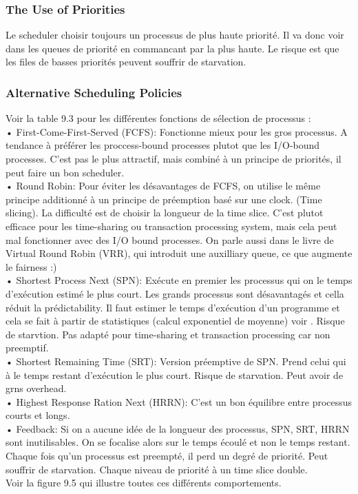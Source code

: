 \subsubsection{The Use of Priorities}
Le scheduler choisir toujours un processus de plus haute priorité. Il va donc voir dans les queues de priorité en commancant par la plus haute. Le risque est que les files de basses priorités peuvent souffrir de starvation.
\subsubsection{Alternative Scheduling Policies}
Voir la table 9.3 pour les différentes fonctions de sélection de processus :\\
• First-Come-First-Served (FCFS): Fonctionne mieux pour les gros processus. A tendance à préférer les proccess-bound processes plutot que les I/O-bound processes. C'est pas le plus attractif, mais combiné à un principe de priorités, il peut faire un bon scheduler.\\
• Round Robin: Pour éviter les désavantages de FCFS, on utilise le même principe additionné à un principe de préemption basé sur une clock. (Time slicing). La difficulté est de choisir la longueur de la time slice. C'est plutot efficace pour les time-sharing ou transaction processing system, mais cela peut mal fonctionner avec des I/O bound processes. On parle aussi dans le livre de Virtual Round Robin (VRR), qui introduit une auxilliary queue, ce que augmente le fairness :)\\
• Shortest Process Next (SPN): Exécute en premier les processus qui on le temps d'exécution estimé le plus court. Les grands processus sont désavantagés et cella réduit la prédictability. Il faut estimer le temps d'exécution d'un programme et cela se fait à partir de statistiques (calcul exponentiel de moyenne) voir \cite[p.~410-411]{stallings}. Risque de starvtion. Pas adapté pour time-sharing et transaction processing car non preemptif.\\
• Shortest Remaining Time (SRT): Version préemptive de SPN. Prend celui qui à le temps restant d'exécution le plus court. Risque de starvation. Peut avoir de grns overhead.\\
• Highest Response Ration Next (HRRN): C'est un bon équilibre entre processus courts et longs.\\
• Feedback: Si on a aucune idée de la longueur des processus, SPN, SRT, HRRN sont inutilisables. On se focalise alors sur le temps écoulé et non le temps restant. Chaque fois qu'un processus est preempté, il perd un degré de priorité. Peut souffrir de starvation. Chaque niveau de priorité à un time slice double.\\
Voir la figure 9.5 \cite[p.~405]{stallings} qui illustre toutes ces différents comportements.
